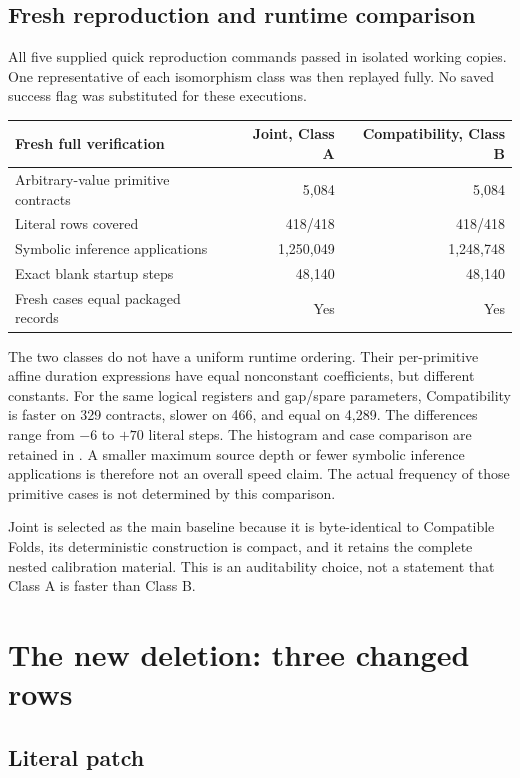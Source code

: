 \documentclass[11pt,letterpaper]{article}
\begin{document}
\subsection{Fresh reproduction and runtime comparison}

All five supplied quick reproduction commands passed in isolated working
copies. One representative of each isomorphism class was then replayed
fully. No saved success flag was substituted for these executions.

\begin{center}\small
\begin{tabular}{@{}lrr@{}}
\toprule
Fresh full verification & Joint, Class A & Compatibility, Class B\\
\midrule
Arbitrary-value primitive contracts & 5,084 & 5,084\\
Literal rows covered & 418/418 & 418/418\\
Symbolic inference applications & 1,250,049 & 1,248,748\\
Exact blank startup steps & 48,140 & 48,140\\
Fresh cases equal packaged records & Yes & Yes\\
\bottomrule
\end{tabular}
\end{center}

The two classes do not have a uniform runtime ordering. Their per-primitive
affine duration expressions have equal nonconstant coefficients, but
different constants. For the same logical registers and gap/spare
parameters, Compatibility is faster on 329 contracts, slower on 466, and
equal on 4,289. The differences range from $-6$ to $+70$ literal steps.
The histogram and case comparison are retained in
. A smaller maximum source depth or
fewer symbolic inference applications is therefore not an overall speed
claim. The actual frequency of those primitive cases is not determined by
this comparison.

Joint is selected as the main baseline because it is byte-identical to
Compatible Folds, its deterministic construction is compact, and it retains
the complete nested calibration material. This is an auditability choice,
not a statement that Class A is faster than Class B.

\section{The new deletion: three changed rows}
\subsection{Literal patch}
\end{document}
